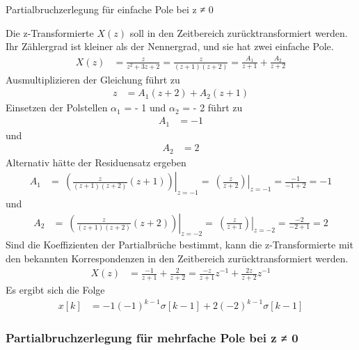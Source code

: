 \begin{example}{Partialbruchzerlegung für einfache Pole bei z ≠ 0}
\label{example:beispiel-partialbruchzerlegung-fuxfcr-einfache-pole-bei-z-0}

Die z-Transformierte \(X(z)\) soll in den Zeitbereich zurücktransformiert werden. Ihr Zählergrad ist kleiner als der Nennergrad, und sie hat zwei einfache Pole.
\begin{align*}
X(z) &= \frac{z}{z^{2} + 3  z + 2} = \frac{z}{(z + 1)  (z + 2)} = \frac{A_{1}}{z + 1} + \frac{A_{2}}{z + 2} 
\end{align*}
Ausmultiplizieren der Gleichung führt zu
\begin{align*}
z &= A_{1}  (z + 2) + A_{2}  (z + 1) 
\end{align*}
Einsetzen der Polstellen \(α_{1}\) = - 1 und \(α_{2}\) = - 2 führt zu
\begin{align*}
A_{1} &= - 1 
\end{align*}
und
\begin{align*}
A_{2} &= 2 
\end{align*}
Alternativ hätte der Residuensatz ergeben
\begin{align*}
A_{1} &= \left. \ \left( \frac{z}{(z + 1)  (z + 2)}  (z + 1) \right) \right|_{z = - 1} = \left. \ \left( \frac{z}{z + 2} \right) \right|_{z = - 1} = \frac{- 1}{- 1 + 2} = - 1 
\end{align*}
und
\begin{align*}
A_{2} &= \left. \ \left( \frac{z}{(z + 1)  (z + 2)}  (z + 2) \right) \right|_{z = - 2} = \left. \ \left( \frac{z}{z + 1} \right) \right|_{z = - 2} = \frac{- 2}{- 2 + 1} = 2 
\end{align*}
Sind die Koeffizienten der Partialbrüche bestimmt, kann die z-Transformierte mit den bekannten Korrespondenzen in den Zeitbereich zurücktransformiert werden.
\begin{align*}
X(z) &= \frac{- 1}{z + 1} + \frac{2}{z + 2} = \frac{- z}{z + 1}  z^{- 1} + \frac{2  z}{z + 2}  z^{- 1} 
\end{align*}
Es ergibt sich die Folge
\begin{align*}
x[ k] &= - 1  ( - 1)^{k - 1}  \sigma[ k - 1] + 2  ( - 2)^{k - 1}  \sigma[ k - 1] 
\end{align*}
\end{example}

\subsubsection{Partialbruchzerlegung für mehrfache Pole bei z ≠ 0}\label{sec:partialbruchzerlegung-fuxfcr-mehrfache-pole-bei-z-0}

